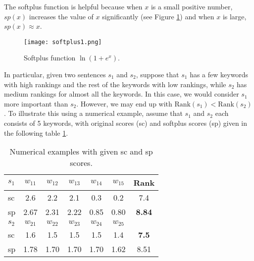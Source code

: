 \documentclass[a4paper,twoside]{article}
\begin{document}
The softplus function is helpful because %
when $x$ is a small positive number, $sp(x)$ increases the value of $x$ significantly (see Figure \ref{fig:softplus})
and when $x$ is large, $sp(x) \approx x$.
\begin{figure}[h]
\centering
\texttt{[image: softplus1.png]}
\caption{Softplus function $\ln(1+e^x)$.} %
\label{fig:softplus}
\end{figure}
In particular,
given two sentences $s_1$ and $s_2$, suppose that $s_1$ has a few keywords with high rankings and the rest of the keywords with low rankings,
while $s_2$ has medium rankings for almost all the keywords. In this case, we would consider $s_1$ more important than $s_2$. However,
we may end up with $\mbox{Rank}(s_1) < \mbox{Rank}(s_2)$.
To illustrate this using a numerical example, assume that $s_1$ and $s_2$ each consists of 5 keywords, with
original scores (sc) and softplus scores (sp) given in the following table \ref{example}.

\medskip


\noindent
\begin{table}[h]
\begin{center}
\caption{\label{example} Numerical examples with given sc and sp scores.}
\begin{tabular}{l||c|c|c|c|c||c}
\hline
$s_1$ & $w_{11}$ & $w_{12}$ & $w_{13}$ & $w_{14}$ & $w_{15}$&   Rank \\
\hline
sc & 2.6 & 2.2 & 2.1 & 0.3 & 0.2 & 7.4\\
sp & 2.67 & 2.31 & 2.22 & 0.85& 0.80 & \bf 8.84\\
\hline
$s_2$ & $w_{21}$ & $w_{22}$ & $w_{23}$ & $w_{24}$ & $w_{25}$ & \\
\hline
sc & 1.6 & 1.5 & 1.5 & 1.5 & 1.4  & \bf 7.5  \\
sp & 1.78& 1.70& 1.70& 1.70& 1.62&  8.51 \\
\hline
\end{tabular}
\end{center}
\end{table}
\end{document}
